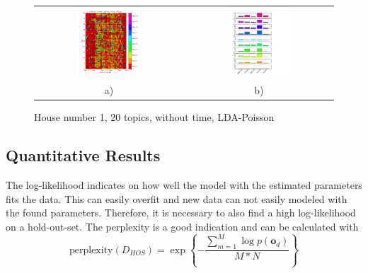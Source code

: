 \begin{figure}
 \centering
 \begin{tabular}{c c}
  \includegraphics[width=0.45\textwidth]{Pictures/DayHN1TS48k20zonerTijdPois.png}
  &
  \includegraphics[width=0.45\textwidth]{Pictures/TopHN1TS48k20zonerTijdPois.png}\\
  a) & b)
 \end{tabular}
  \caption{House number 1, 20 topics, without time, LDA-Poisson}
  \label{fig:ohneZeitPois}
\end{figure}

\pagebreak

\subsection{Quantitative Results}
The log-likelihood indicates on how well the model with the estimated parameters fits the data. This can easily overfit and new data can not easily modeled with the found parameters. Therefore, it is necessary to also find a high log-likelihood on a hold-out-set. The perplexity is a good indication and can be calculated with
\begin{equation}
 \text{perplexity}(D_{HOS}) = \exp \left\{ - \frac{\sum_{m=1}^M \log p(\textbf{o}_d ) }{M*N} \right\}
\end{equation}

